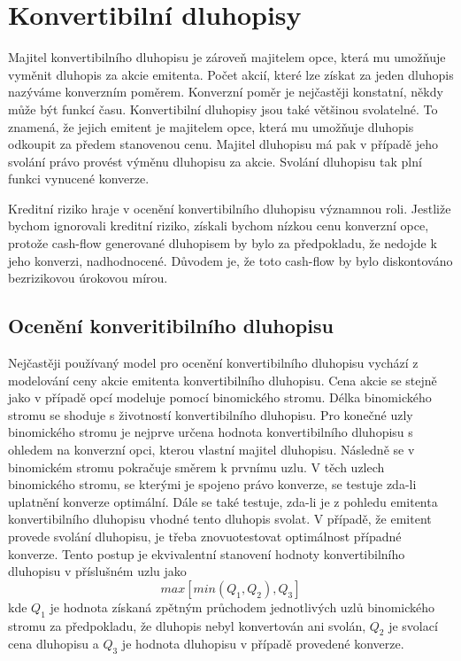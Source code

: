 \documentclass[a4paper]{book}
\begin{document}
\section{Konvertibilní dluhopisy}

Majitel konvertibilního dluhopisu je zároveň majitelem opce, která mu umožňuje vyměnit dluhopis za akcie emitenta. Počet akcií, které lze získat za jeden dluhopis nazýváme konverzním poměrem. Konverzní poměr je nejčastěji konstatní, někdy může být funkcí času. Konvertibilní dluhopisy jsou také většinou svolatelné. To znamená, že jejich emitent je majitelem opce, která mu umožňuje dluhopis odkoupit za předem stanovenou cenu. Majitel dluhopisu má pak v případě jeho svolání právo provést výměnu dluhopisu za akcie. Svolání dluhopisu tak plní funkci vynucené konverze.

Kreditní riziko hraje v ocenění konvertibilního dluhopisu významnou roli. Jestliže bychom ignorovali kreditní riziko, získali bychom nízkou cenu konverzní opce, protože cash-flow generované dluhopisem by bylo za předpokladu, že nedojde k jeho konverzi, nadhodnocené. Důvodem je, že toto cash-flow by bylo diskontováno bezrizikovou úrokovou mírou.

\subsection{Ocenění konveritibilního dluhopisu}
Nejčastěji používaný model pro ocenění konvertibilního dluhopisu vychází z modelování ceny akcie emitenta konvertibilního dluhopisu. Cena akcie se stejně jako v případě opcí modeluje pomocí binomického stromu. Délka binomického stromu se shoduje s životností konvertibilního dluhopisu. Pro konečné uzly binomického stromu je nejprve určena hodnota konvertibilního dluhopisu s ohledem na konverzní opci, kterou vlastní majitel dluhopisu. Následně se v binomickém stromu pokračuje směrem k prvnímu uzlu. V těch uzlech binomického stromu, se kterými je spojeno právo konverze, se testuje zda-li uplatnění konverze optimální. Dále se také testuje, zda-li je z pohledu emitenta konvertibilního dluhopisu vhodné tento dluhopis svolat. V případě, že emitent provede svolání dluhopisu, je třeba znovuotestovat optimálnost případné konverze. Tento postup je ekvivalentní stanovení hodnoty konvertibilního dluhopisu v příslušném uzlu jako
\begin{equation*}
max[min(Q_1, Q_2), Q_3]
\end{equation*}
kde $Q_1$ je hodnota získaná zpětným průchodem jednotlivých uzlů binomického stromu za předpokladu, že dluhopis nebyl konvertován ani svolán, $Q_2$ je svolací cena dluhopisu a $Q_3$ je hodnota dluhopisu v případě provedené konverze.
\end{document}
